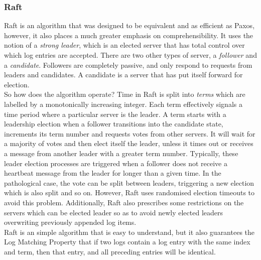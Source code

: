 \documentclass[12pt,a4paper,twoside,openright]{report}
\begin{document}
			\subsubsection*{Raft}
			Raft \cite{Raft} is an algorithm that was designed to be equivalent and as efficient as Paxos, however, it also places a much greater emphasis on comprehensibility.
			It uses the notion of a \textit{strong leader}, which is an elected server that has total control over which log entries are accepted.
			There are two other types of server, a \textit{follower} and a \textit{candidate}. 
			Followers are completely passive, and only respond to requests from leaders and candidates. 
			A candidate is a server that has put itself forward for election.\\

			So how does the algorithm operate? 
			Time in Raft is split into \textit{terms} which are labelled by a monotonically increasing integer. 
			Each term effectively signals a time period where a particular server is the leader. 
			A term starts with a leadership election when a follower transitions into the candidate state, increments its term number and requests votes from other servers. 
			It will wait for a majority of votes and then elect itself the leader, unless it times out or receives a message from another leader with a greater term number. 
			Typically, these leader election processes are triggered when a follower does not receive a heartbeat message from the leader for longer than a given time.
			In the pathological case, the vote can be split between leaders, triggering a new election which is also split and so on.
			However, Raft uses randomised election timeouts to avoid this problem.
			Additionally, Raft also prescribes some restrictions on the servers which can be elected leader so as to avoid newly elected leaders overwriting previously appended log items.\\
			
			Raft is an simple algorithm that is easy to understand, but it also guarantees the Log Matching Property that if two logs contain a log entry with the same index and term, then that entry, and all preceding entries will be identical.
\end{document}
